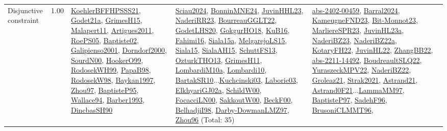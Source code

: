 {\begin{longtable}{p{3cm}r>{\raggedright\arraybackslash}p{6cm}>{\raggedright\arraybackslash}p{6cm}>{\raggedright\arraybackslash}p{8cm}}
\index{Disjunctive constraint}\index{Constraints!Disjunctive constraint}Disjunctive constraint &  1.00 & \hyperref[detail:KoehlerBFFHPSSS21]{KoehlerBFFHPSSS21}, \hyperref[detail:Godet21a]{Godet21a}, \hyperref[detail:GrimesH15]{GrimesH15}, \hyperref[detail:Malapert11]{Malapert11}, \hyperref[detail:Artigues2011]{Artigues2011}, \hyperref[detail:RoePS05]{RoePS05}, \hyperref[detail:Baptiste02]{Baptiste02}, \hyperref[detail:Galipienso2001]{Galipienso2001}, \hyperref[detail:Dorndorf2000]{Dorndorf2000}, \hyperref[detail:SourdN00]{SourdN00}, \hyperref[detail:HookerO99]{HookerO99}, \hyperref[detail:RodosekWH99]{RodosekWH99}, \hyperref[detail:PapaB98]{PapaB98}, \hyperref[detail:RodosekW98]{RodosekW98}, \hyperref[detail:Baykan1997]{Baykan1997}, \hyperref[detail:Zhou97]{Zhou97}, \hyperref[detail:BaptisteP95]{BaptisteP95}, \hyperref[detail:Wallace94]{Wallace94}, \hyperref[detail:Barber1993]{Barber1993}, \hyperref[detail:DincbasSH90]{DincbasSH90} & \hyperref[detail:Sciau2024]{Sciau2024}, \hyperref[detail:BonninMNE24]{BonninMNE24}, \hyperref[detail:JuvinHHL23]{JuvinHHL23}, \hyperref[detail:NaderiRR23]{NaderiRR23}, \hyperref[detail:BourreauGGLT22]{BourreauGGLT22}, \hyperref[detail:GodetLHS20]{GodetLHS20}, \hyperref[detail:GokgurHO18]{GokgurHO18}, \hyperref[detail:KuB16]{KuB16}, \hyperref[detail:Fahimi16]{Fahimi16}, \hyperref[detail:Siala15a]{Siala15a}, \hyperref[detail:MelgarejoLS15]{MelgarejoLS15}, \hyperref[detail:Siala15]{Siala15}, \hyperref[detail:SialaAH15]{SialaAH15}, \hyperref[detail:SchuttFS13]{SchuttFS13}, \hyperref[detail:OzturkTHO13]{OzturkTHO13}, \hyperref[detail:GrimesH11]{GrimesH11}, \hyperref[detail:LombardiM10a]{LombardiM10a}, \hyperref[detail:Lombardi10]{Lombardi10}, \hyperref[detail:BartakSR10]{BartakSR10}...\hyperref[detail:Kuchcinski03]{Kuchcinski03}, \hyperref[detail:Laborie03]{Laborie03}, \hyperref[detail:ElkhyariGJ02a]{ElkhyariGJ02a}, \hyperref[detail:SchildW00]{SchildW00}, \hyperref[detail:FocacciLN00]{FocacciLN00}, \hyperref[detail:SakkoutW00]{SakkoutW00}, \hyperref[detail:BeckF00]{BeckF00}, \hyperref[detail:BelhadjiI98]{BelhadjiI98}, \hyperref[detail:Darby-DowmanLMZ97]{Darby-DowmanLMZ97}, \hyperref[detail:Zhou96]{Zhou96} (Total: 35) & \hyperref[detail:abs-2402-00459]{abs-2402-00459}, \hyperref[detail:Barral2024]{Barral2024}, \hyperref[detail:KameugneFND23]{KameugneFND23}, \hyperref[detail:Bit-Monnot23]{Bit-Monnot23}, \hyperref[detail:MarliereSPR23]{MarliereSPR23}, \hyperref[detail:JuvinHL23a]{JuvinHL23a}, \hyperref[detail:NaderiBZ23]{NaderiBZ23}, \hyperref[detail:NaderiBZ22a]{NaderiBZ22a}, \hyperref[detail:KotaryFH22]{KotaryFH22}, \hyperref[detail:JuvinHL22]{JuvinHL22}, \hyperref[detail:ZhangBB22]{ZhangBB22}, \hyperref[detail:abs-2211-14492]{abs-2211-14492}, \hyperref[detail:BoudreaultSLQ22]{BoudreaultSLQ22}, \hyperref[detail:YuraszeckMPV22]{YuraszeckMPV22}, \hyperref[detail:NaderiBZ22]{NaderiBZ22}, \hyperref[detail:Groleaz21]{Groleaz21}, \hyperref[detail:Strak2021]{Strak2021}, \hyperref[detail:Astrand21]{Astrand21}, \hyperref[detail:Astrand0F21]{Astrand0F21}...\hyperref[detail:LammaMM97]{LammaMM97}, \hyperref[detail:BaptisteP97]{BaptisteP97}, \hyperref[detail:SadehF96]{SadehF96}, \hyperref[detail:BrusoniCLMMT96]{BrusoniCLMMT96}, 
\end{longtable}}
